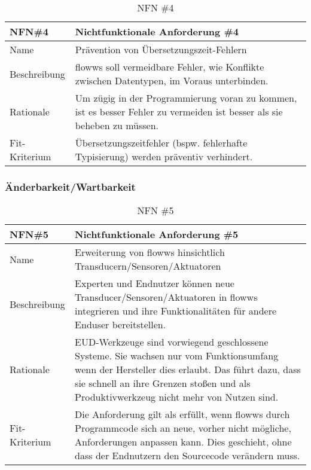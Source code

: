 \begin{table}[H]
\caption{NFN \#4}
\label{tab:nfn5}
\begin{tabularx}{\textwidth}{lX}
\hline
\rowcolor[HTML]{EFEFEF} 
NFN\#4        & Nichtfunktionale Anforderung \#4 \\ \hline
Name          & Prävention von Übersetzungszeit-Fehlern \\ \hline
Beschreibung  & flowws soll vermeidbare Fehler, wie Konflikte zwischen Datentypen, im Voraus unterbinden. \\ \hline
Rationale     & Um zügig in der Programmierung voran zu kommen, ist es besser Fehler zu vermeiden ist besser als sie beheben zu müssen. \\ \hline
Fit-Kriterium & Übersetzungszeitfehler (bspw. fehlerhafte Typisierung) werden präventiv verhindert.   \\ \hline

\end{tabularx}
\end{table}




\subsubsection{Änderbarkeit/Wartbarkeit}
\begin{table}[H]
\caption{NFN \#5}
\label{tab:nfn5}
\begin{tabularx}{\textwidth}{lX}
\hline
\rowcolor[HTML]{EFEFEF} 
NFN\#5        & Nichtfunktionale Anforderung \#5 \\ \hline
Name          & Erweiterung von flowws hinsichtlich Transducern/Sensoren/Aktuatoren \\ \hline
Beschreibung  & Experten und Endnutzer können neue Transducer/Sensoren/Aktuatoren in flowws integrieren und ihre Funktionalitäten für andere Enduser bereitstellen. \\ \hline
Rationale     & \ac{EUD}-Werkzeuge sind vorwiegend geschlossene Systeme. Sie wachsen nur vom Funktionsumfang wenn der Hersteller dies erlaubt. Das führt dazu, dass sie schnell an ihre Grenzen stoßen und als Produktivwerkzeug nicht mehr von Nutzen sind. \\ \hline
Fit-Kriterium & Die Anforderung gilt als erfüllt, wenn flowws durch Programmcode sich an neue, vorher nicht mögliche, Anforderungen anpassen kann. Dies geschieht, ohne dass der Endnutzern den Sourcecode verändern muss. \\ \hline
\end{tabularx}
\end{table}
